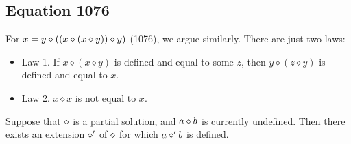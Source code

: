 \subsection{Equation 1076}
For $x = y \diamond ((x \diamond (x \diamond y)) \diamond y)$ (1076), we argue similarly. There are just two laws:
\begin{itemize}
    \item Law 1.  If $x \diamond (x \diamond y)$ is defined and equal to some $z$,
then $y \diamond (z \diamond y)$ is defined and equal to $x$.
    \item Law 2.  $x \diamond x$ is not equal to $x$.
\end{itemize}

\begin{lemma}[1076 extension]\label{1076-extension}\leanok{}  Suppose that $\diamond$ is a partial solution, and $a \diamond b$ is currently undefined.  Then there exists an extension $\diamond'$ of $\diamond$ for which $a \diamond' b$ is defined.
\end{lemma}
